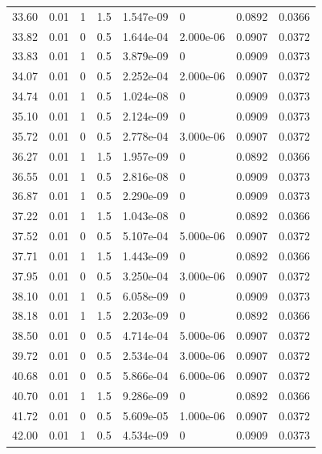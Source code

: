 \documentclass[preview]{standalone}
\begin{document}
{{{\begin{tabular}{L{1.2cm}C{1.2cm} C{0.3cm}C{0.5cm} C{1.4cm}C{1.4cm} C{1.4cm}C{1.4cm}}
  33.60  &  0.01  & 1     & 1.5 &  1.547e-09  & 0  & 0.0892 &  0.0366   \\ 
  33.82  &  0.01  & 0     & 0.5 &  1.644e-04  & 2.000e-06  & 0.0907 &  0.0372   \\ 
  33.83  &  0.01  & 1     & 0.5 &  3.879e-09  & 0  & 0.0909 &  0.0373   \\ 
  34.07  &  0.01  & 0     & 0.5 &  2.252e-04  & 2.000e-06  & 0.0907 &  0.0372   \\ 
  34.74  &  0.01  & 1     & 0.5 &  1.024e-08  & 0  & 0.0909 &  0.0373   \\ 
  35.10  &  0.01  & 1     & 0.5 &  2.124e-09  & 0  & 0.0909 &  0.0373   \\ 
  35.72  &  0.01  & 0     & 0.5 &  2.778e-04  & 3.000e-06  & 0.0907 &  0.0372   \\ 
  36.27  &  0.01  & 1     & 1.5 &  1.957e-09  & 0  & 0.0892 &  0.0366   \\ 
  36.55  &  0.01  & 1     & 0.5 &  2.816e-08  & 0  & 0.0909 &  0.0373   \\ 
  36.87  &  0.01  & 1     & 0.5 &  2.290e-09  & 0  & 0.0909 &  0.0373   \\ 
  37.22  &  0.01  & 1     & 1.5 &  1.043e-08  & 0  & 0.0892 &  0.0366   \\ 
  37.52  &  0.01  & 0     & 0.5 &  5.107e-04  & 5.000e-06  & 0.0907 &  0.0372   \\ 
  37.71  &  0.01  & 1     & 1.5 &  1.443e-09  & 0  & 0.0892 &  0.0366   \\ 
  37.95  &  0.01  & 0     & 0.5 &  3.250e-04  & 3.000e-06  & 0.0907 &  0.0372   \\ 
  38.10  &  0.01  & 1     & 0.5 &  6.058e-09  & 0  & 0.0909 &  0.0373   \\ 
  38.18  &  0.01  & 1     & 1.5 &  2.203e-09  & 0  & 0.0892 &  0.0366   \\ 
  38.50  &  0.01  & 0     & 0.5 &  4.714e-04  & 5.000e-06  & 0.0907 &  0.0372   \\ 
  39.72  &  0.01  & 0     & 0.5 &  2.534e-04  & 3.000e-06  & 0.0907 &  0.0372   \\ 
  40.68  &  0.01  & 0     & 0.5 &  5.866e-04  & 6.000e-06  & 0.0907 &  0.0372   \\ 
  40.70  &  0.01  & 1     & 1.5 &  9.286e-09  & 0  & 0.0892 &  0.0366   \\ 
  41.72  &  0.01  & 0     & 0.5 &  5.609e-05  & 1.000e-06  & 0.0907 &  0.0372   \\ 
  42.00  &  0.01  & 1     & 0.5 &  4.534e-09  & 0  & 0.0909 &  0.0373   \\ 

\end{tabular}}}}
\end{document}
